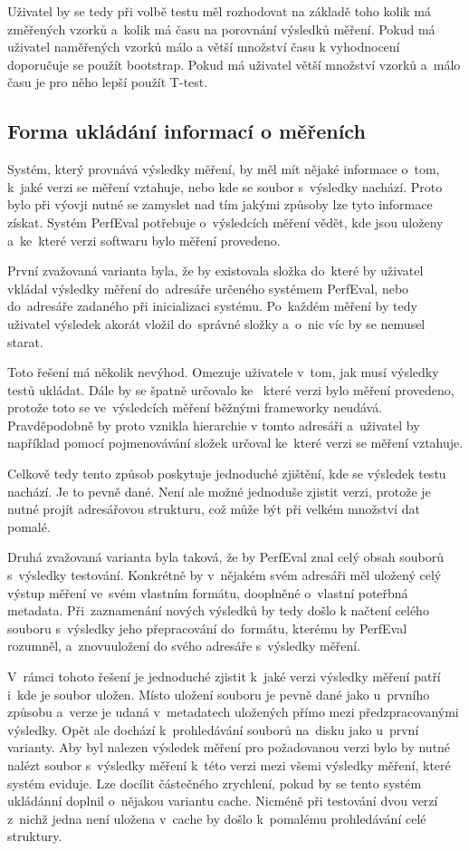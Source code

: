 Uživatel by se tedy při volbě testu měl rozhodovat na základě toho kolik má změřených vzorků a~kolik má času na porovnání
výsledků měření. Pokud má uživatel naměřených vzorků málo a větší množství času k vyhodnocení doporučuje se použít bootstrap.
Pokud má uživatel větší množství vzorků a~málo času je pro něho lepší použít T-test.

\subsection{Forma ukládání informací o měřeních}
Systém, který provnává výsledky měření, by měl mít nějaké informace o~tom, k~jaké verzi se měření vztahuje, nebo kde
se soubor s~výsledky nachází. Proto bylo při výovji nutné se zamyslet nad tím jakými způsoby lze tyto informace získat.
Systém PerfEval potřebuje o~výsledcích měření vědět, kde jsou uloženy a~ke~které verzi softwaru bylo měření provedeno.

První zvažovaná varianta byla, že by existovala složka do~které by uživatel vkládal výsledky měření do~adresáře určeného
systémem PerfEval, nebo do~adresáře zadaného při inicializaci systému. Po~každém měření by tedy uživatel výsledek akorát
vložil do~správné složky a~o~nic víc by se nemusel starat.

Toto řešení má několik nevýhod. Omezuje uživatele v~tom, jak musí výsledky testů ukládat. Dále by se špatně určovalo ke~
které verzi bylo měření provedeno, protože toto se ve~výsledcích měření běžnými frameworky neudává. Pravděpodobně by proto
vznikla hierarchie v tomto adresáři a~uživatel by například pomocí pojmenovávání složek určoval ke~které verzi se měření vztahuje.

Celkově tedy tento způsob poskytuje jednoduché zjištění, kde se výsledek testu nachází. Je to pevně dané. Není ale možné jednoduše
zjistit verzi, protože je nutné projít adresářovou strukturu, což může být při velkém množství dat pomalé.

Druhá zvažovaná varianta byla taková, že by PerfEval znal celý obsah souborů s~výsledky testování. Konkrétně by v~nějakém
svém adresáři měl uložený celý výstup měření ve~svém vlastním formátu, dooplněné o~vlastní poteřbná metadata. Při~zaznamenání
nových výsledků by tedy došlo k načtení celého souboru s~výsledky jeho přepracování do~formátu, kterému by PerfEval rozumněl,
a~znovuuložení do svého adresáře s~výsledky měření.

V~rámci tohoto řešení je jednoduché zjistit k~jaké verzi výsledky měření patří i~kde je soubor uložen. Místo uložení souboru
je pevně dané jako u~prvního způsobu a~verze je udaná v~metadatech uložených přímo mezi předzpracovanými výsledky. Opět
ale dochází k~prohledávání souborů na~disku jako u~první varianty. Aby byl nalezen výsledek měření pro požadovanou verzi bylo
by nutné nalézt soubor s~výsledky měření k~této verzi mezi všemi výsledky měření, které systém eviduje. Lze docílit částečného
zrychlení, pokud by se tento systém ukládánní doplnil o~nějakou variantu cache. Nicméně při testování dvou verzí z~nichž
jedna není uložena v~cache by došlo k~pomalému prohledávání celé struktury.

